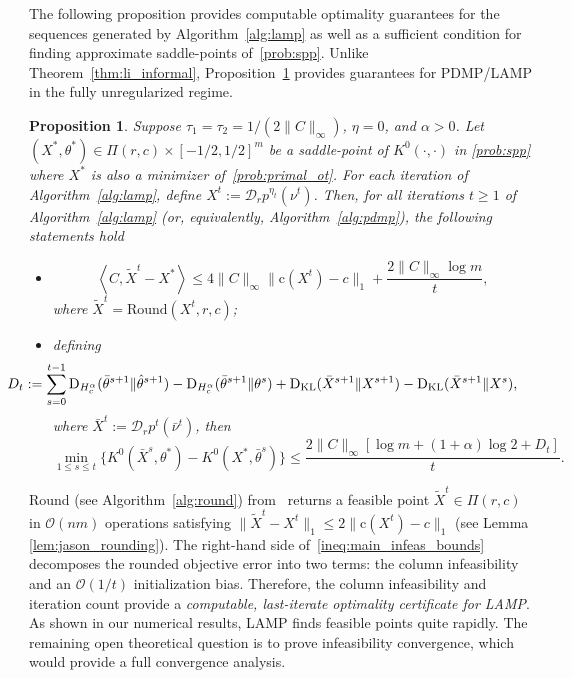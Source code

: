 \documentclass[10pt]{article}
\newcommand{\DHa}{\D_{H_c^\alpha}}
\newcommand{\inner}[2]{\left\langle #1,#2\right\rangle}
\newcommand{\coup}{\Pi}
\newcommand{\D}{\operatorname{D}}
\newcommand{\diag}[1]{\mathcal{D}_{#1}}
\theoremstyle{plain}
\newtheorem{proposition}[theorem]{Proposition}
\theoremstyle{definition}
\theoremstyle{remark}
\newcommand{\KL}{\mathrm{D}_\mathrm{KL}}
\newcommand{\col}{\bm{\mathrm{c}}}
\begin{document}
The following proposition provides computable optimality guarantees for the sequences generated by Algorithm~\ref{alg:lamp} as well as a sufficient condition for finding approximate saddle-points of~\eqref{prob:spp}. Unlike Theorem~\ref{thm:li_informal}, Proposition~\ref{prop:infeas_bound} provides guarantees for PDMP/LAMP in the fully unregularized regime.
\begin{proposition}\label{prop:infeas_bound}
    Suppose $\tau_1=\tau_2=1/(2\|C\|_\infty)$, $\eta =0$, and $\alpha>0$. Let $(X^*,\theta^*)\in\coup(r,c)\times[-1/2,1/2]^m$ be a saddle-point of $K^0(\cdot,\cdot)$ in \eqref{prob:spp} where $X^*$ is also a minimizer of~\eqref{prob:primal_ot}. For each iteration of Algorithm~\ref{alg:lamp}, define $X^t:=\diag{r}p^{\eta_t}(\nu^t)$. Then, for all iterations $t\geq 1$ of Algorithm~\ref{alg:lamp} (or, equivalently, Algorithm~\ref{alg:pdmp}), the following statements hold
    \begin{itemize}
        \item[a)] 
        \begin{equation}\label{ineq:main_infeas_bounds}
        \inner{C}{\widetilde X^t-X^*}\leq 4\|C\|_\infty\|\col(X^t)-c\|_1 +\frac{2\|C\|_\infty\log m}{t},
    \end{equation}
    where $\widetilde X^t=\text{Round}(X^t, r, c)$;
    \item[b)] defining
    \begin{equation}\label{def:sum_condition}
\hspace{-1.5cm}    D_t:=\sum_{s=0}^{t-1}\DHa(\bar\theta^{s+1}\|\hat\theta^{s+1})- \DHa(\bar\theta^{s+1}\|\theta^{s})+\KL(\bar X^{s+1}\|X^{s+1})- \KL(\bar X^{s+1}\|X^{s}),\end{equation}
    where $\bar X^t:=\diag{r}p^t(\bar\nu^t)$, then
    \begin{equation}\label{ineq:spp_midpoint_conv}
        \min_{1\leq s\leq t}\{K^0(\bar{X}^{s},\theta^*)-K^0(X^*,\bar\theta^s)\}\leq\frac{2\|C\|_\infty[\log m+(1+\alpha)\log 2+D_t]}{t}.
    \end{equation}
    
    \end{itemize}
\end{proposition}

 Round (see Algorithm~\ref{alg:round}) from~\cite{altschulerNearlinearTimeApproximation2017} returns a feasible point $\widetilde{X}^t\in\coup(r,c)$ in $\mathcal{O}(nm)$ operations satisfying $\|\widetilde{X}^t-X^t\|_1\leq 2\|\col(X^t)-c\|_1$ (see Lemma \ref{lem:jason_rounding}). The right-hand side of~\eqref{ineq:main_infeas_bounds} decomposes the rounded objective error into two terms: the column infeasibility and an $\mathcal{O}(1/t)$ initialization bias. Therefore, the column infeasibility and iteration count provide a \emph{computable, last-iterate optimality certificate for LAMP}. As shown in our numerical results, LAMP finds feasible points quite rapidly. The remaining open theoretical question is to prove infeasibility convergence, which would provide a full convergence analysis.
\end{document}
